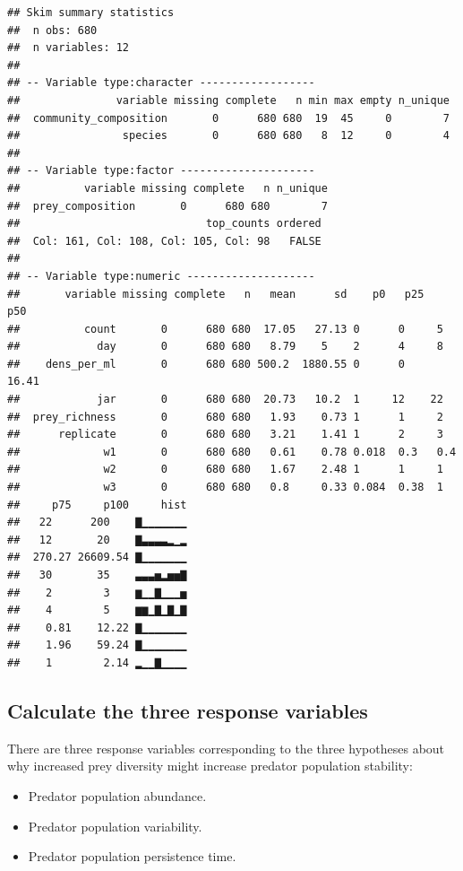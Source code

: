 \documentclass[]{book}
\providecommand{\tightlist}{%
  \setlength{\itemsep}{0pt}\setlength{\parskip}{0pt}}
\begin{document}
\begin{verbatim}
## Skim summary statistics
##  n obs: 680 
##  n variables: 12 
## 
## -- Variable type:character ------------------
##               variable missing complete   n min max empty n_unique
##  community_composition       0      680 680  19  45     0        7
##                species       0      680 680   8  12     0        4
## 
## -- Variable type:factor ---------------------
##          variable missing complete   n n_unique
##  prey_composition       0      680 680        7
##                             top_counts ordered
##  Col: 161, Col: 108, Col: 105, Col: 98   FALSE
## 
## -- Variable type:numeric --------------------
##       variable missing complete   n   mean      sd    p0   p25   p50
##          count       0      680 680  17.05   27.13 0      0     5   
##            day       0      680 680   8.79    5    2      4     8   
##    dens_per_ml       0      680 680 500.2  1880.55 0      0    16.41
##            jar       0      680 680  20.73   10.2  1     12    22   
##  prey_richness       0      680 680   1.93    0.73 1      1     2   
##      replicate       0      680 680   3.21    1.41 1      2     3   
##             w1       0      680 680   0.61    0.78 0.018  0.3   0.4 
##             w2       0      680 680   1.67    2.48 1      1     1   
##             w3       0      680 680   0.8     0.33 0.084  0.38  1   
##     p75     p100     hist
##   22      200    ▇▁▁▁▁▁▁▁
##   12       20    ▇▃▃▃▃▂▁▂
##  270.27 26609.54 ▇▁▁▁▁▁▁▁
##   30       35    ▃▃▃▅▂▅▅▇
##    2        3    ▆▁▁▇▁▁▁▅
##    4        5    ▆▆▁▇▁▇▁▇
##    0.81    12.22 ▇▁▁▁▁▁▁▁
##    1.96    59.24 ▇▁▁▁▁▁▁▁
##    1        2.14 ▂▁▁▇▁▁▁▁
\end{verbatim}

\hypertarget{calculate-the-three-response-variables}{%
\subsection{Calculate the three response variables}\label{calculate-the-three-response-variables}}

There are three response variables corresponding to the three hypotheses about why increased prey diversity might increase predator population stability:

\begin{itemize}
\tightlist
\item
  Predator population abundance.
\item
  Predator population variability.
\item
  Predator population persistence time.
\end{itemize}
\end{document}
